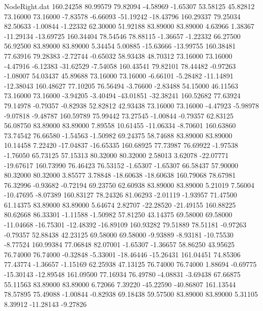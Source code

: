 \begin{filecontents}{NodeRight.dat}
 160.24258   80.99579   79.82094    -4.58969   -1.65307   53.58125   45.82812   73.16000   73.16000   -7.83578   -6.66093  -51.19242  -18.43796
 160.29337   79.25034   82.50633    -1.00844   -1.22332   62.30000   51.92188   83.89000   83.89000    4.63966    1.38367  -11.29134  -13.69725
 160.34404   78.54546   78.88115    -1.36657   -1.22332   66.27500   56.92500   83.89000   83.89000    5.34454    5.00885  -15.63666  -13.99755
 160.38481   77.63916   79.28383    -2.72744   -0.65032   58.93438   48.70312   73.16000   73.16000   -4.47916   -6.12383  -31.62529   -7.54058
 160.43541   79.82101   78.44482    -0.97263   -1.08007   54.03437   45.89688   73.16000   73.16000   -6.66101   -5.28482  -11.14891  -12.38043
 160.48627   77.10205   76.56494    -3.76600   -2.83488   54.15000   46.11563   73.16000   73.16000   -3.94205   -3.40494  -43.01851  -32.38241
 160.52682   77.63924   79.14978    -0.79357   -0.82938   52.82812   42.93438   73.16000   73.16000   -4.47923   -5.98978   -9.07818   -9.48787
 160.59789   75.99442   73.27545    -1.00844   -0.79357   62.83125   56.08750   83.89000   83.89000    7.89558   10.61455  -11.06334   -8.70601
 160.63860   73.74542   76.66580    -1.54563   -1.50982   69.24375   58.74688   83.89000   83.89000   10.14458    7.22420  -17.04837  -16.65335
 160.68925   77.73987   76.69922    -1.97538   -1.76050   65.73125   57.15313   80.32000   80.32000    2.58013    3.62078  -22.07771  -19.67617
 160.73990   76.46423   76.53152    -1.65307   -1.65307   66.58437   57.90000   80.32000   80.32000    3.85577    3.78848  -18.60638  -18.60638
 160.79068   78.67981   76.32996    -0.93682   -0.72194   69.23750   62.60938   83.89000   83.89000    5.21019    7.56004  -10.47695   -8.07389
 160.83127   78.24326   81.06293    -2.01119   -1.93957   71.47500   61.14375   83.89000   83.89000    5.64674    2.82707  -22.28520  -21.49155
 160.88225   80.62668   86.33301    -1.11588   -1.50982   57.81250   43.14375   69.58000   69.58000  -11.04668  -16.75301  -12.48392  -16.89109
 160.93282   79.51889   78.51181    -0.97263   -0.79357   52.88438   42.23125   69.58000   69.58000   -9.93889   -8.93181  -10.75530   -8.77524
 160.99384   77.06848   82.07001    -1.65307   -1.36657   58.86250   43.95625   76.74000   76.74000   -0.32848   -5.33001  -18.46446  -15.26431
 161.04451   74.85306   77.43774    -1.36657   -1.15169   62.25938   47.13125   76.74000   76.74000    1.88694   -0.69775  -15.30143  -12.89548
 161.09500   77.16934   76.49780    -4.08831   -3.69438   67.66875   55.11563   83.89000   83.89000    6.72066    7.39220  -45.22590  -40.86807
 161.13544   78.57895   75.49088    -1.00844   -0.82938   69.18438   59.57500   83.89000   83.89000    5.31105    8.39912  -11.28143   -9.27826

\end{filecontents}
